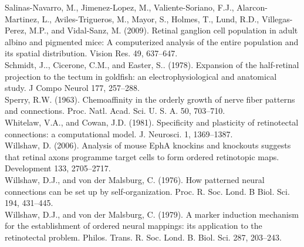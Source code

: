 \documentclass[11pt]{"article"}
\begin{document}
{Salinas-Navarro, M., Jimenez-Lopez, M., Valiente-Soriano, F.J., Alarcon-Martinez, L., Aviles-Trigueros, M., Mayor, S., Holmes, T., Lund, R.D., Villegas-Perez, M.P., and Vidal-Sanz, M. (2009). Retinal ganglion cell population in adult albino and pigmented mice: A computerized analysis of the entire population and its spatial distribution. Vision Res. 49, 637–647. \\

Schmidt, J.., Cicerone, C.M., and Easter, S.. (1978). Expansion of the half-retinal projection to the tectum in goldfish: an electrophysiological and anatomical study. J Compo Neurol 177, 257–288. \\

Sperry, R.W. (1963). Chemoaffinity in the orderly growth of nerve fiber patterns and connections. Proc. Natl. Acad. Sci. U. S. A. 50, 703–710. \\

Whitelaw, V.A., and Cowan, J.D. (1981). Specificity and plasticity of retinotectal connections: a computational model. J. Neurosci. 1, 1369–1387. \\

Willshaw, D. (2006). Analysis of mouse EphA knockins and knockouts suggests that retinal axons programme target cells to form ordered retinotopic maps. Development 133, 2705–2717. \\

Willshaw, D.J., and von der Malsburg, C. (1976). How patterned neural connections can be set up by self-organization. Proc. R. Soc. Lond. B Biol. Sci. 194, 431–445. \\

Willshaw, D.J., and von der Malsburg, C. (1979). A marker induction mechanism for the establishment of ordered neural mappings: its application to the retinotectal problem. Philos. Trans. R. Soc. Lond. B. Biol. Sci. 287, 203–243.\par}
\end{document}
